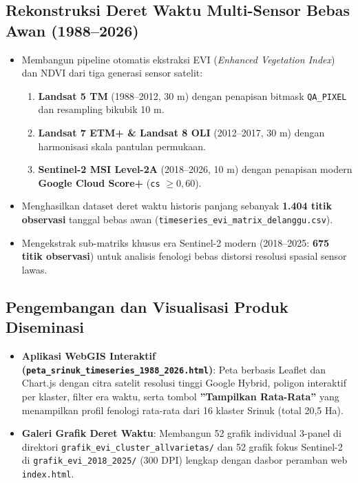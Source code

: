 \documentclass[11pt,a4paper]{article}
\begin{document}
\subsection{Rekonstruksi Deret Waktu Multi-Sensor Bebas Awan (1988--2026)}
\begin{itemize}
    \item Membangun pipeline otomatis ekstraksi EVI (\textit{Enhanced Vegetation Index}) dan NDVI dari tiga generasi sensor satelit:
    \begin{enumerate}
        \item \textbf{Landsat 5 TM} (1988--2012, 30 m) dengan penapisan bitmask \texttt{QA\_PIXEL} dan resampling bikubik 10 m.
        \item \textbf{Landsat 7 ETM+ \& Landsat 8 OLI} (2012--2017, 30 m) dengan harmonisasi skala pantulan permukaan.
        \item \textbf{Sentinel-2 MSI Level-2A} (2018--2026, 10 m) dengan penapisan modern \textbf{Google Cloud Score+} (\texttt{cs} $\ge 0{,}60$).
    \end{enumerate}
    \item Menghasilkan dataset deret waktu historis panjang sebanyak \textbf{1.404 titik observasi} tanggal bebas awan (\texttt{timeseries\_evi\_matrix\_delanggu.csv}).
    \item Mengekstrak sub-matriks khusus era Sentinel-2 modern (2018--2025: \textbf{675 titik observasi}) untuk analisis fenologi bebas distorsi resolusi spasial sensor lawas.
\end{itemize}

\subsection{Pengembangan dan Visualisasi Produk Diseminasi}
\begin{itemize}
    \item \textbf{Aplikasi WebGIS Interaktif (\texttt{peta\_srinuk\_timeseries\_1988\_2026.html})}: Peta berbasis Leaflet dan Chart.js dengan citra satelit resolusi tinggi Google Hybrid, poligon interaktif per klaster, filter era waktu, serta tombol \textbf{''Tampilkan Rata-Rata''} yang menampilkan profil fenologi rata-rata dari 16 klaster Srinuk (total 20,5 Ha).
    \item \textbf{Galeri Grafik Deret Waktu}: Membangun 52 grafik individual 3-panel di direktori \texttt{grafik\_evi\_cluster\_allvarietas/} dan 52 grafik fokus Sentinel-2 di \texttt{grafik\_evi\_2018\_2025/} (300 DPI) lengkap dengan dasbor peramban web \texttt{index.html}.
\end{itemize}
\end{document}
